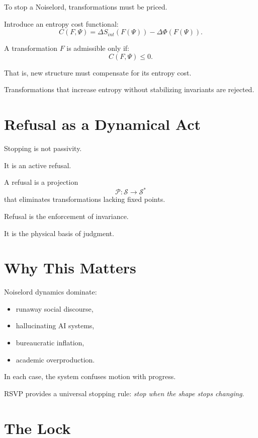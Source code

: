 \documentclass[11pt]{book}
\begin{document}
To stop a Noiselord, transformations must be priced.

Introduce an entropy cost functional:
\[
C(F,\Psi) = \Delta S_{int}(F(\Psi)) - \Delta \Phi(F(\Psi)).
\]

\begin{proposition}
A transformation \(F\) is admissible only if:
\[
C(F,\Psi) \leq 0.
\]
\end{proposition}

That is, new structure must compensate for its entropy cost.

Transformations that increase entropy without stabilizing invariants are
rejected.

\section{Refusal as a Dynamical Act}

Stopping is not passivity.

It is an active refusal.

\begin{definition}
A refusal is a projection
\[
\mathcal{P} : \mathcal{S} \rightarrow \mathcal{S}^\ast
\]
that eliminates transformations lacking fixed points.
\end{definition}

Refusal is the enforcement of invariance.

It is the physical basis of judgment.

\section{Why This Matters}

Noiselord dynamics dominate:

\begin{itemize}
\item runaway social discourse,
\item hallucinating AI systems,
\item bureaucratic inflation,
\item academic overproduction.
\end{itemize}

In each case, the system confuses motion with progress.

RSVP provides a universal stopping rule:
\emph{stop when the shape stops changing}.

\section{The Lock}
\end{document}
